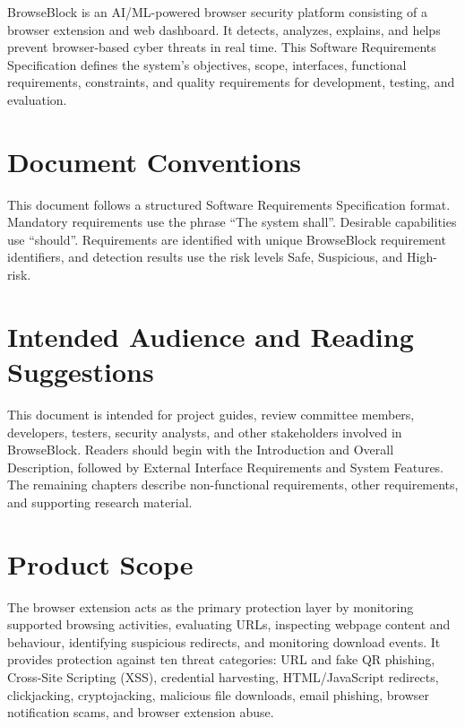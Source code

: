 \documentclass[12pt,a4paper]{report}
\begin{document}
BrowseBlock is an AI/ML-powered browser security platform consisting of a browser extension and web dashboard. It detects, analyzes, explains, and helps prevent browser-based cyber threats in real time. This Software Requirements Specification defines the system's objectives, scope, interfaces, functional requirements, constraints, and quality requirements for development, testing, and evaluation.\par

\section{Document Conventions}

This document follows a structured Software Requirements Specification format. Mandatory requirements use the phrase ``The system shall''. Desirable capabilities use ``should''. Requirements are identified with unique BrowseBlock requirement identifiers, and detection results use the risk levels Safe, Suspicious, and High-risk.\par

\section{Intended Audience and Reading Suggestions}

This document is intended for project guides, review committee members, developers, testers, security analysts, and other stakeholders involved in BrowseBlock. Readers should begin with the Introduction and Overall Description, followed by External Interface Requirements and System Features. The remaining chapters describe non-functional requirements, other requirements, and supporting research material.\par

\section{Product Scope}

The browser extension acts as the primary protection layer by monitoring supported browsing activities, evaluating URLs, inspecting webpage content and behaviour, identifying suspicious redirects, and monitoring download events. It provides protection against ten threat categories: URL and fake QR phishing, Cross-Site Scripting (XSS), credential harvesting, HTML/JavaScript redirects, clickjacking, cryptojacking, malicious file downloads, email phishing, browser notification scams, and browser extension abuse.\par
\end{document}
